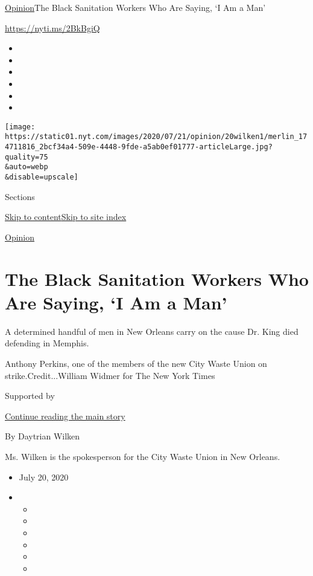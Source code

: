 \href{/section/opinion}{Opinion}\textbar{}The Black Sanitation Workers
Who Are Saying, `I Am a Man'

\href{https://nyti.ms/2BkBgiQ}{https://nyti.ms/2BkBgiQ}

\begin{itemize}
\item
\item
\item
\item
\item
\item
\end{itemize}

\texttt{[image: https://static01.nyt.com/images/2020/07/21/opinion/20wilken1/merlin\_174711816\_2bcf34a4-509e-4448-9fde-a5ab0ef01777-articleLarge.jpg?quality=75\\\&auto=webp\\\&disable=upscale]}

Sections

\protect\hyperlink{site-content}{Skip to
content}\protect\hyperlink{site-index}{Skip to site index}

\href{/section/opinion}{Opinion}

\hypertarget{the-black-sanitation-workers-who-are-saying-i-am-a-man}{%
\section{The Black Sanitation Workers Who Are Saying, `I Am a
Man'}\label{the-black-sanitation-workers-who-are-saying-i-am-a-man}}

A determined handful of men in New Orleans carry on the cause Dr. King
died defending in Memphis.

Anthony Perkins, one of the members of the new City Waste Union on
strike.Credit...William Widmer for The New York Times

Supported by

\protect\hyperlink{after-sponsor}{Continue reading the main story}

By Daytrian Wilken

Ms. Wilken is the spokesperson for the City Waste Union in New Orleans.

\begin{itemize}
\item
  July 20, 2020
\item
  \begin{itemize}
  \item
  \item
  \item
  \item
  \item
  \item
  \end{itemize}
\end{itemize}

